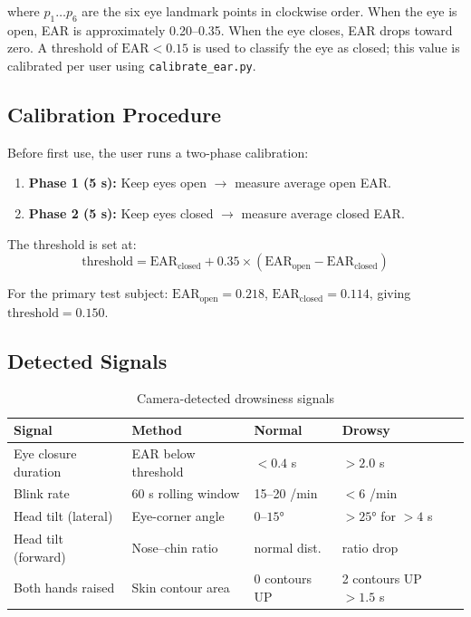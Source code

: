 \documentclass[12pt, a4paper]{article}
\begin{document}
where $p_1 \ldots p_6$ are the six eye landmark points in clockwise order.
When the eye is open, EAR is approximately 0.20--0.35. When the eye closes,
EAR drops toward zero. A threshold of $\text{EAR} < 0.15$ is used to classify
the eye as closed; this value is calibrated per user using \texttt{calibrate\_ear.py}.

\subsection{Calibration Procedure}

Before first use, the user runs a two-phase calibration:

\begin{enumerate}
    \item \textbf{Phase 1 (5 s):} Keep eyes open $\rightarrow$ measure average open EAR.
    \item \textbf{Phase 2 (5 s):} Keep eyes closed $\rightarrow$ measure average closed EAR.
\end{enumerate}

The threshold is set at:
\begin{equation}
    \text{threshold} = \text{EAR}_\text{closed} + 0.35 \times (\text{EAR}_\text{open} - \text{EAR}_\text{closed})
\end{equation}

For the primary test subject: $\text{EAR}_\text{open} = 0.218$,
$\text{EAR}_\text{closed} = 0.114$, giving $\text{threshold} = 0.150$.

\subsection{Detected Signals}

\begin{table}[H]
\centering
\caption{Camera-detected drowsiness signals}
\begin{tabularx}{\textwidth}{lXll}
\toprule
\textbf{Signal} & \textbf{Method} & \textbf{Normal} & \textbf{Drowsy} \\
\midrule
Eye closure duration & EAR below threshold & $<0.4$ s & $>2.0$ s \\
Blink rate           & 60 s rolling window & 15--20 /min & $<6$ /min \\
Head tilt (lateral)  & Eye-corner angle    & $0$--$15°$ & $>25°$ for $>4$ s \\
Head tilt (forward)  & Nose--chin ratio    & normal dist. & ratio drop \\
Both hands raised    & Skin contour area   & 0 contours UP & 2 contours UP $>1.5$ s \\
\bottomrule
\end{tabularx}
\end{table}
\end{document}
